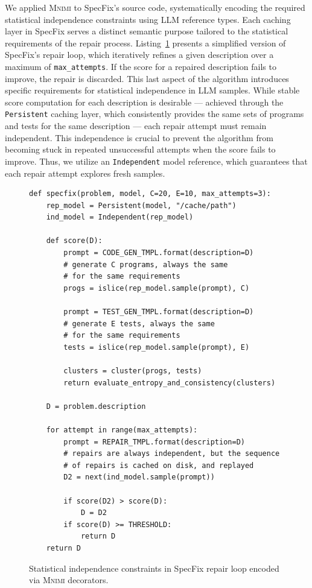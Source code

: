 \documentclass[sigconf]{acmart}
\newcommand{\projName}{\textsc{Mnimi}\xspace}
\begin{document}
We applied \projName to SpecFix's source code, systematically encoding the required statistical independence constraints using LLM reference types. Each caching layer in SpecFix serves a distinct semantic purpose tailored to the statistical requirements of the repair process. Listing~\ref{code_specfix} presents a simplified version of SpecFix's repair loop, which iteratively refines a given description over a maximum of \texttt{max\_attempts}. If the score for a repaired description fails to improve, the repair is discarded. This last aspect of the algorithm introduces specific requirements for statistical independence in LLM samples. While stable score computation for each description is desirable --- achieved through the \texttt{Persistent} caching layer, which consistently provides the same sets of programs and tests for the same description --- each repair attempt must remain independent. This independence is crucial to prevent the algorithm from becoming stuck in repeated unsuccessful attempts when the score fails to improve. Thus, we utilize an \texttt{Independent} model reference, which guarantees that each repair attempt explores fresh samples.

\begin{figure}[htbp] 
\caption{Statistical independence constraints in SpecFix repair loop encoded via \projName decorators.} 
\label{code_specfix}
\captionsetup{justification=raggedright, singlelinecheck=false} 
\begin{lstlisting}
def specfix(problem, model, C=20, E=10, max_attempts=3):
    rep_model = Persistent(model, "/cache/path")
    ind_model = Independent(rep_model)

    def score(D):
        prompt = CODE_GEN_TMPL.format(description=D)
        # generate C programs, always the same
        # for the same requirements
        progs = islice(rep_model.sample(prompt), C)

        prompt = TEST_GEN_TMPL.format(description=D)
        # generate E tests, always the same
        # for the same requirements
        tests = islice(rep_model.sample(prompt), E)
        
        clusters = cluster(progs, tests)
        return evaluate_entropy_and_consistency(clusters)

    D = problem.description
        
    for attempt in range(max_attempts):
        prompt = REPAIR_TMPL.format(description=D)
        # repairs are always independent, but the sequence
        # of repairs is cached on disk, and replayed
        D2 = next(ind_model.sample(prompt))

        if score(D2) > score(D):
            D = D2
        if score(D) >= THRESHOLD:
            return D
    return D
\end{lstlisting}
\vspace{-1.1\baselineskip}
\end{figure}
\end{document}
